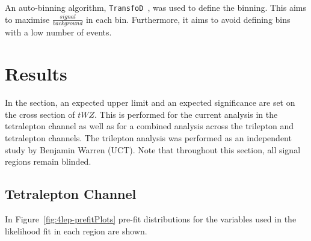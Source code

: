 An auto-binning algorithm, \texttt{TransfoD}~\cite{transfod-autobin}, was used to define the binning. This aims to maximise $\frac{signal}{background}$ in each bin. Furthermore, it aims to avoid defining bins with a low number of events.

\section{Results}

In the section, an expected upper limit and an expected significance are set on the cross section of $tWZ$. This is performed for the current analysis in the tetralepton channel as well as for a combined analysis across the trilepton and tetralepton channels. The trilepton analysis was performed as an independent study by Benjamin Warren (UCT). Note that throughout this section, all signal regions remain blinded.

\subsection{Tetralepton Channel}

In Figure~\ref{fig:4lep-prefitPlots} pre-fit distributions for the variables used in the likelihood fit in each region are shown.

